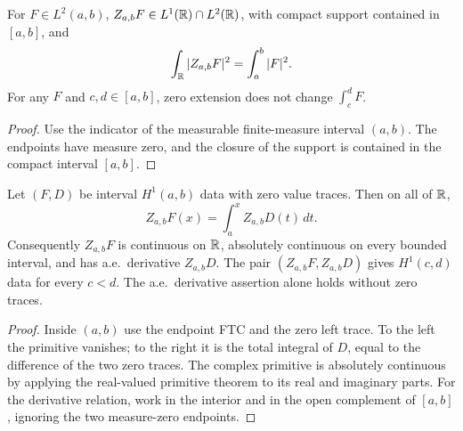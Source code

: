 \begin{lemma}
\label{lem:interval-zero-extension-l2}
\leanok
For $F\in L^2(a,b)$, $Z_{a,b}F\in L^1(\mathbb{R})\cap L^2(\mathbb{R})$, with compact
support contained in $[a,b]$, and
\[
 \int_{\mathbb{R}} |Z_{a,b}F|^2=\int_a^b|F|^2.
\]
For any $F$ and $c,d\in[a,b]$, zero extension does not change
$\int_c^d F$.
\end{lemma}

\begin{proof}
\leanok
Use the indicator of the measurable finite-measure interval $(a,b)$.
The endpoints have measure zero, and the closure of the support is contained
in the compact interval $[a,b]$.
\end{proof}

\begin{lemma}
\label{lem:h1-zero-extension}
\leanok
Let $(F,D)$ be interval $H^1(a,b)$ data with zero value traces.
Then on all of $\mathbb{R}$,
\[
 Z_{a,b}F(x)=\int_a^x Z_{a,b}D(t)\,dt.
\]
Consequently $Z_{a,b}F$ is continuous on $\mathbb{R}$, absolutely continuous on every
bounded interval, and has a.e.\ derivative $Z_{a,b}D$. The pair
$(Z_{a,b}F,Z_{a,b}D)$ gives $H^1(c,d)$ data for every $c<d$.
The a.e.\ derivative assertion alone holds without zero traces.
\end{lemma}

\begin{proof}
\leanok
Inside $(a,b)$ use the endpoint FTC and the zero left trace.
To the left the primitive vanishes; to the right it is the total integral
of $D$, equal to the difference of the two zero traces.
The complex primitive is absolutely continuous by applying the real-valued
primitive theorem to its real and imaginary parts.
For the derivative relation, work in the interior and in the open complement
of $[a,b]$, ignoring the two measure-zero endpoints.
\end{proof}

